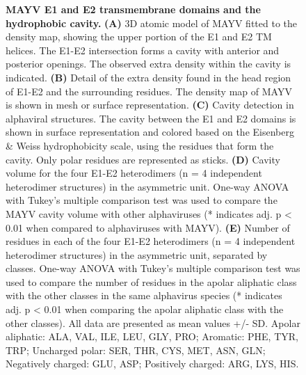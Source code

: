 \documentclass[Ingles]{phdthesis}
\begin{document}
\begin{figure}
  \caption[MAYV E1 and E2 transmembrane domains and the hydrophobic cavity]{\textbf{MAYV E1 and E2 transmembrane domains and the hydrophobic cavity.} \textbf{(A)} \acs{3D} atomic model of \acs{MAYV} fitted to the density map, showing the upper portion of the E1 and E2 TM helices. The E1-E2 intersection forms a cavity with anterior and posterior openings. The observed extra density within the cavity is indicated. \textbf{(B)} Detail of the extra density found in the head region of E1-E2 and the surrounding residues. The density map of \acs{MAYV} is shown in mesh or surface representation. \textbf{(C)} Cavity detection in alphaviral structures. The cavity between the E1 and E2 domains is shown in surface representation and colored based on the Eisenberg & Weiss hydrophobicity scale, using the residues that form the cavity. Only polar residues are represented as sticks. \textbf{(D)} Cavity volume for the four E1-E2 heterodimers (n = 4 independent heterodimer structures) in the asymmetric unit. One-way ANOVA with Tukey's multiple comparison test was used to compare the \acs{MAYV} cavity volume with other alphaviruses (* indicates adj. p < 0.01 when compared to alphaviruses with \acs{MAYV}). \textbf{(E)} Number of residues in each of the four E1-E2 heterodimers (n = 4 independent heterodimer structures) in the asymmetric unit, separated by classes. One-way ANOVA with Tukey's multiple comparison test was used to compare the number of residues in the apolar aliphatic class with the other classes in the same alphavirus species (* indicates adj. p < 0.01 when comparing the apolar aliphatic class with the other classes). All data are presented as mean values +/- SD. Apolar aliphatic: ALA, VAL, ILE, LEU, GLY, PRO; Aromatic: PHE, TYR, TRP; Uncharged polar: SER, THR, CYS, MET, ASN, GLN; Negatively charged: GLU, ASP; Positively charged: ARG, LYS, HIS.}
  \label{fig:mayv-e1-e2}
\end{figure}
\end{document}
